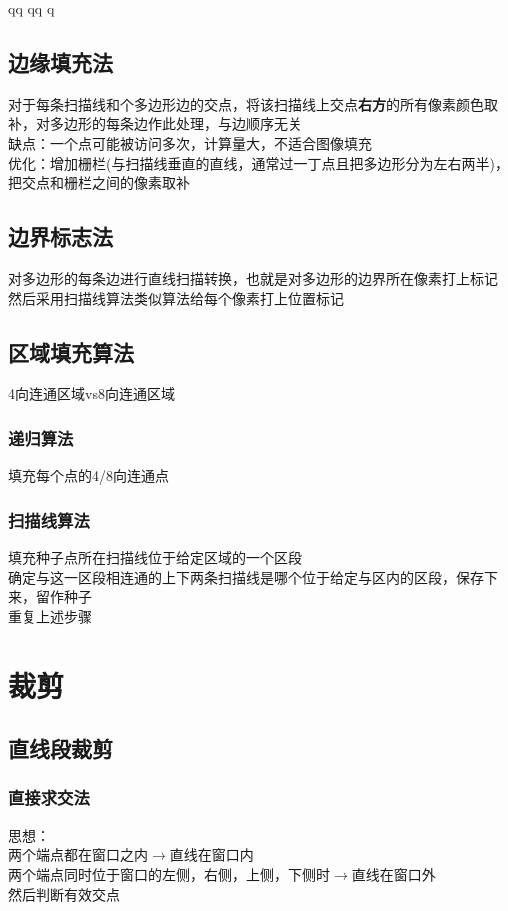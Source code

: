 qq	qq	q                                                                                                                                                                                                                                                                                      \documentclass{article}
\begin{document}
\begin{CJK}{UTF8}{gbsn}
	\subsection{边缘填充法}
	对于每条扫描线和个多边形边的交点，将该扫描线上交点\textbf{右方}的所有像素颜色取补，对多边形的每条边作此处理，与边顺序无关\\
	缺点：一个点可能被访问多次，计算量大，不适合图像填充\\
	优化：增加栅栏(与扫描线垂直的直线，通常过一丁点且把多边形分为左右两半)，把交点和栅栏之间的像素取补\\
	\subsection{边界标志法}
	对多边形的每条边进行直线扫描转换，也就是对多边形的边界所在像素打上标记\\
	然后采用扫描线算法类似算法给每个像素打上位置标记\\
	\subsection{区域填充算法}
	4向连通区域vs8向连通区域\\
	\subsubsection{递归算法}
	填充每个点的4/8向连通点\\
	\subsubsection{扫描线算法}
	填充种子点所在扫描线位于给定区域的一个区段\\
	确定与这一区段相连通的上下两条扫描线是哪个位于给定与区内的区段，保存下来，留作种子\\
	重复上述步骤\\

	
\section{裁剪}
\subsection{直线段裁剪}
\subsubsection{直接求交法}
	思想：\\
两个端点都在窗口之内$\rightarrow$直线在窗口内\\
两个端点同时位于窗口的左侧，右侧，上侧，下侧时$\rightarrow$直线在窗口外\\
然后判断有效交点\\

\end{CJK}
\end{document}
